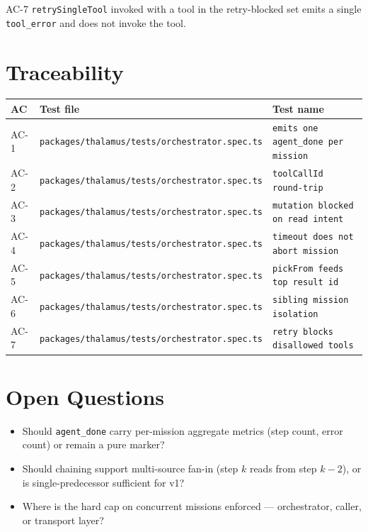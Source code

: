 \begin{ac}{AC-7}
\texttt{retrySingleTool} invoked with a tool in the retry-blocked set emits a single \texttt{tool\_error} and does not invoke the tool.
\end{ac}

\section{Traceability}

\begin{center}
\begin{tabular}{@{}lll@{}}
\toprule
AC & Test file & Test name \\
\midrule
AC-1 & \texttt{packages/thalamus/tests/orchestrator.spec.ts} & \texttt{emits one agent\_done per mission} \\
AC-2 & \texttt{packages/thalamus/tests/orchestrator.spec.ts} & \texttt{toolCallId round-trip} \\
AC-3 & \texttt{packages/thalamus/tests/orchestrator.spec.ts} & \texttt{mutation blocked on read intent} \\
AC-4 & \texttt{packages/thalamus/tests/orchestrator.spec.ts} & \texttt{timeout does not abort mission} \\
AC-5 & \texttt{packages/thalamus/tests/orchestrator.spec.ts} & \texttt{pickFrom feeds top result id} \\
AC-6 & \texttt{packages/thalamus/tests/orchestrator.spec.ts} & \texttt{sibling mission isolation} \\
AC-7 & \texttt{packages/thalamus/tests/orchestrator.spec.ts} & \texttt{retry blocks disallowed tools} \\
\bottomrule
\end{tabular}
\end{center}

\section{Open Questions}
\begin{itemize}[leftmargin=1.2em]
  \item Should \texttt{agent\_done} carry per-mission aggregate metrics (step count, error count) or remain a pure marker?
  \item Should chaining support multi-source fan-in (step $k$ reads from step $k-2$), or is single-predecessor sufficient for v1?
  \item Where is the hard cap on concurrent missions enforced --- orchestrator, caller, or transport layer?
\end{itemize}


